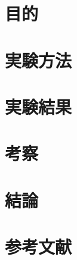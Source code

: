 \documentclass[a4paper, 11pt]{ltjsarticle}
\begin{document}
\section{目的}
\section{実験方法}
\section{実験結果}
\section{考察}
\section{結論}
\section*{参考文献}
\end{document}
